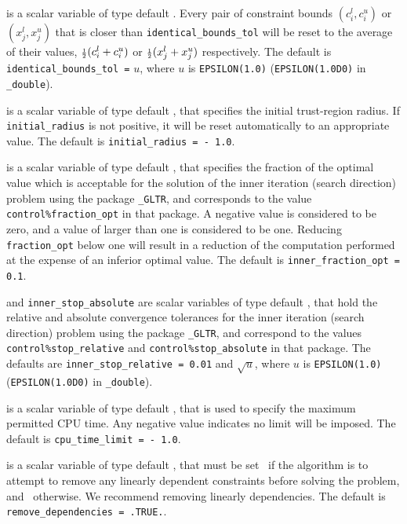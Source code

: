 \begin{description}
is a scalar variable of type default \realdp.
Every pair of constraint bounds 
$(c_{i}^{l}, c_{i}^{u})$ or $(x_{j}^{l}, x_{j}^{u})$
that is closer than {\tt identical\_bounds\_tol} 
will be reset to the average of their values,
${\scriptstyle \frac{1}{2}} (c_{i}^{l} + c_{i}^{u})$ or ${\scriptstyle \frac{1}{2}} (x_{j}^{l} + x_{j}^{u})$
respectively.
The default is {\tt identical\_bounds\_tol =} $u$,
where $u$ is {\tt EPSILON(1.0)} ({\tt EPSILON(1.0D0)} in 
{\tt \fullpackagename\_double}).

 is a scalar variable of type default 
\realdp, that specifies the initial trust-region radius. 
If {\tt initial\_radius} is
not positive, it will be reset automatically to an appropriate value.
The default is {\tt initial\_radius = - 1.0}.

 is a scalar variable of type default 
\realdp, that specifies the
fraction of the optimal value which is acceptable for the solution of the
inner iteration (search direction) problem using the package 
{\tt \libraryname\_GLTR}, 
and corresponds to the value {\tt control\%fraction\_opt} in that package.
A negative value is considered to be zero, and a value of larger than one
is considered to be one. Reducing {\tt fraction\_opt} below one will result
in a reduction of the computation performed at the expense of an inferior
optimal value.
The default is {\tt inner\_fraction\_opt = 0.1}.

 and {\tt inner\_stop\_absolute} 
are scalar variables of type default \realdp, 
that hold the relative and absolute convergence tolerances for the
inner iteration (search direction) problem using the package 
{\tt \libraryname\_GLTR},
and correspond to the values {\tt control\%stop\_relative} and
{\tt control\%stop\_absolute} in that package.
The defaults are 
{\tt inner\_stop\_relative = 0.01}
and  $\sqrt{u}$,
where $u$ is {\tt EPSILON(1.0)} ({\tt EPSILON(1.0D0)} in 
{\tt \fullpackagename\_double}).

 is a scalar variable of type default \realdp, 
that is used to specify the maximum permitted CPU time. Any negative
value indicates no limit will be imposed. The default is 
{\tt cpu\_time\_limit = - 1.0}.

 is a scalar variable of type 
default \logical, that must be set \true\ if the algorithm
is to attempt to remove any linearly dependent constraints before
solving the problem, and \false\ otherwise. 
We recommend removing linearly dependencies.
The default is {\tt remove\_dependencies = .TRUE.}.


\end{description}
